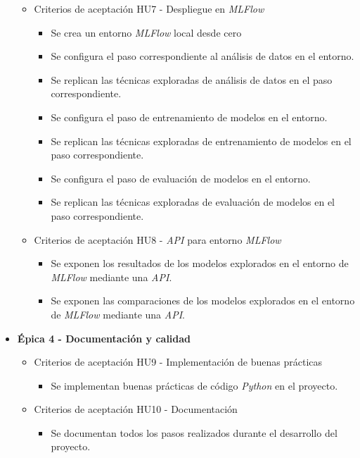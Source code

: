 \documentclass[
11pt, %
]{charter}
\begin{document}
\begin{itemize}
\begin{itemize}
      \item Criterios de aceptación HU7 - Despliegue en \textit{MLFlow}
        \begin{itemize}
            \item Se crea un entorno \textit{MLFlow} local desde cero
            \item Se configura el paso correspondiente al análisis de datos en el entorno.
            \item Se replican las técnicas exploradas de análisis de datos en el paso correspondiente.
            \item Se configura el paso de entrenamiento de modelos en el entorno.
            \item Se replican las técnicas exploradas de entrenamiento  de modelos en el paso correspondiente.
            \item Se configura el paso de evaluación de modelos en el entorno.
            \item Se replican las técnicas exploradas de evaluación de modelos en el paso correspondiente.
        \end{itemize}
      \item Criterios de aceptación HU8 - \textit{API} para entorno \textit{MLFlow}
        \begin{itemize}
            \item Se exponen los resultados de los modelos explorados en el entorno de \textit{MLFlow} mediante una \textit{API}.
            \item Se exponen las comparaciones de los modelos explorados en el entorno de \textit{MLFlow} mediante una \textit{API}.
        \end{itemize}
    \end{itemize}
  \item \textbf{\'{E}pica 4 - Documentación y calidad}
    \begin{itemize}
      \item Criterios de aceptación HU9 - Implementación de buenas prácticas
        \begin{itemize}
            \item Se implementan buenas prácticas de código \textit{Python} en el proyecto.
        \end{itemize}
      \item Criterios de aceptación HU10 - Documentación
        \begin{itemize}
            \item Se documentan todos los pasos realizados durante el desarrollo del proyecto.

\end{itemize}
\end{itemize}
\end{itemize}
\end{document}
